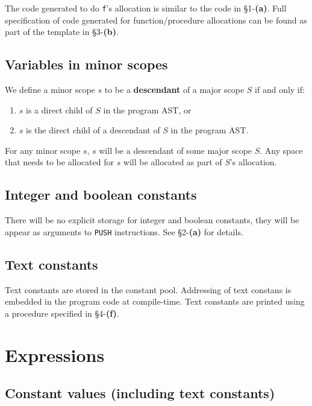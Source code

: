 \documentclass[11pt]{article}
\begin{document}
The code generated to do \texttt{f}'s allocation is similar to the code in \S 1-\textbf{(a)}. Full specification of code generated for function/procedure allocations can be found as part of the template in \S 3-\textbf{(b)}.

\subsection{Variables in minor scopes}

We define a minor scope $s$ to be a \textbf{descendant} of a major scope $S$ if and only if:
    \begin{enumerate}[label=(\arabic*)]
    \item $s$ is a direct child of $S$ in the program AST, or
    \item $s$ is the direct child of a descendant of $S$ in the program AST.
    \end{enumerate}

For any minor scope $s$, $s$ will be a descendant of some major scope $S$. Any space that needs to be allocated for $s$ will be allocated as part of $S$'s allocation.

\subsection{Integer and boolean constants}

There will be no explicit storage for integer and boolean constants, they will be appear as arguments to \texttt{PUSH} instructions. See \S 2-\textbf{(a)} for details.

\subsection{Text constants}

Text constants are stored in the constant pool. Addressing of text constans is embedded in the program code at compile-time. Text constants are printed using a procedure specified in \S 4-\textbf{(f)}.

\section{Expressions}

\subsection{Constant values (including text constants)}
\end{document}
